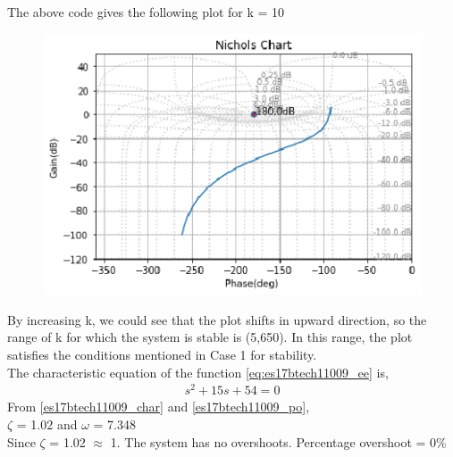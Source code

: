 \begin{enumerate}[label=\thesection.\arabic*.,ref=\thesection.\theenumi]
The above code gives the following plot for k = 10
\begin{figure}[!h]
\centering
\includegraphics[width=\columnwidth]{./figs/es17btech11009_5.eps}
\caption{}
\label{fig:es17btech11009_fig2}
\end{figure}

By increasing k, we could see that the plot shifts in upward direction, so the range of k for which the system is stable is (5,650). In this range, the plot satisfies the conditions mentioned in Case 1 for stability.
\\
The characteristic equation of the function \eqref{eq:es17btech11009_ee} is,
\begin{align}
 s^2 +15s +54 = 0
 \end{align}
From \eqref{es17btech11009_char} and \eqref{es17btech11009_po},
\\
  $\zeta$ = 1.02 and $\omega$ = 7.348
  \\
  Since $\zeta$ = 1.02 $\approx$ 1. The system has no overshoots.
  Percentage overshoot = 0\%


\end{enumerate}
